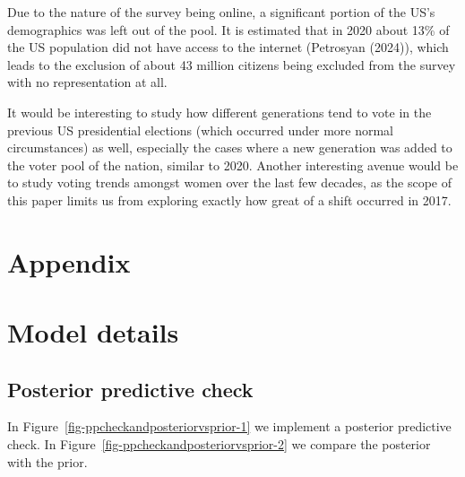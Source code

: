 \documentclass[
  letterpaper,
  DIV=11,
  numbers=noendperiod]{scrartcl}
\begin{document}
Due to the nature of the survey being online, a significant portion of
the US's demographics was left out of the pool. It is estimated that in
2020 about 13\% of the US population did not have access to the internet
(Petrosyan (2024)), which leads to the exclusion of about 43 million
citizens being excluded from the survey with no representation at all.

It would be interesting to study how different generations tend to vote
in the previous US presidential elections (which occurred under more
normal circumstances) as well, especially the cases where a new
generation was added to the voter pool of the nation, similar to 2020.
Another interesting avenue would be to study voting trends amongst women
over the last few decades, as the scope of this paper limits us from
exploring exactly how great of a shift occurred in 2017.

\newpage

\appendix

\hypertarget{appendix}{%
\section*{Appendix}\label{appendix}}

\hypertarget{sec-model-details}{%
\section{Model details}\label{sec-model-details}}

\hypertarget{posterior-predictive-check}{%
\subsection{Posterior predictive
check}\label{posterior-predictive-check}}

In Figure~\ref{fig-ppcheckandposteriorvsprior-1} we implement a
posterior predictive check. In
Figure~\ref{fig-ppcheckandposteriorvsprior-2} we compare the posterior
with the prior.
\end{document}
